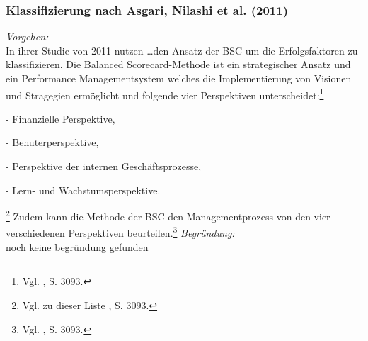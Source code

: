 \noindent
\subsubsection{Klassifizierung nach Asgari, Nilashi et al. (2011)}
\textit{Vorgehen:}\\\noindent
In ihrer Studie von 2011 nutzen \ldots den Ansatz der \ac{BSC} um die Erfolgsfaktoren zu klassifizieren. 
Die Balanced Scorecard-Methode ist ein strategischer Ansatz und ein Performance Managementsystem welches die Implementierung
von Visionen und Stragegien ermöglicht und folgende vier Perspektiven unterscheidet:\footnote{Vgl. \cite{Anshari.2011}, S. 3093.}
\begin{imtemize}
\item[-]{Finanzielle Perspektive,}
\item[-]{Benuterperspektive,}
\item[-]{Perspektive der internen Geschäftsprozesse,}
\item[-]{Lern- und Wachstumsperspektive.}
\end{imtemize}\footnote{Vgl. zu dieser Liste \cite{Anshari.2011}, S. 3093.}
Zudem kann die Methode der \ac{BSC} den Managementprozess von den vier verschiedenen Perspektiven beurteilen.\footnote{Vgl. \cite{Anshari.2011}, S. 3093.}
\textit{Begründung:}\\\noindent
noch keine begründung gefunden